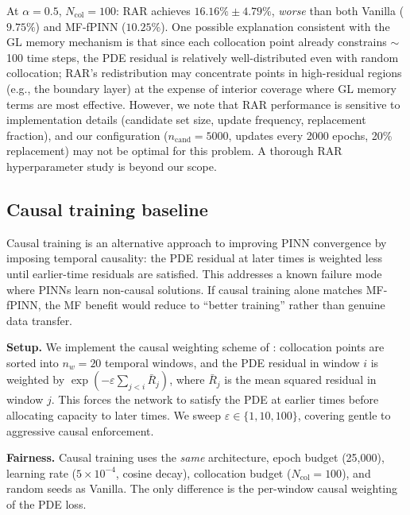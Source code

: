 \documentclass[preprint,12pt]{elsarticle}
\newcommand{\Ncol}{N_{\mathrm{col}}}
\begin{document}
At $\alpha = 0.5$, $\Ncol = 100$: RAR achieves $16.16\% \pm 4.79\%$, \emph{worse} than both Vanilla ($9.75\%$) and MF-fPINN ($10.25\%$). One possible explanation consistent with the GL memory mechanism is that since each collocation point already constrains $\sim$100 time steps, the PDE residual is relatively well-distributed even with random collocation; RAR's redistribution may concentrate points in high-residual regions (e.g., the boundary layer) at the expense of interior coverage where GL memory terms are most effective. However, we note that RAR performance is sensitive to implementation details (candidate set size, update frequency, replacement fraction), and our configuration ($n_{\mathrm{cand}} = 5000$, updates every 2000 epochs, 20\% replacement) may not be optimal for this problem. A thorough RAR hyperparameter study is beyond our scope.

\subsection{Causal training baseline}
\label{sec:causal}

Causal training \cite{wang2022respecting} is an alternative approach to improving PINN convergence by imposing temporal causality: the PDE residual at later times is weighted less until earlier-time residuals are satisfied. This addresses a known failure mode where PINNs learn non-causal solutions. If causal training alone matches MF-fPINN, the MF benefit would reduce to ``better training'' rather than genuine data transfer.

\textbf{Setup.} We implement the causal weighting scheme of \cite{wang2022respecting}: collocation points are sorted into $n_w = 20$ temporal windows, and the PDE residual in window $i$ is weighted by $\exp(-\varepsilon \sum_{j<i} \bar{R}_j)$, where $\bar{R}_j$ is the mean squared residual in window $j$. This forces the network to satisfy the PDE at earlier times before allocating capacity to later times. We sweep $\varepsilon \in \{1, 10, 100\}$, covering gentle to aggressive causal enforcement.

\textbf{Fairness.} Causal training uses the \emph{same} architecture, epoch budget (25{,}000), learning rate ($5 \times 10^{-4}$, cosine decay), collocation budget ($\Ncol = 100$), and random seeds as Vanilla. The only difference is the per-window causal weighting of the PDE loss.
\end{document}
